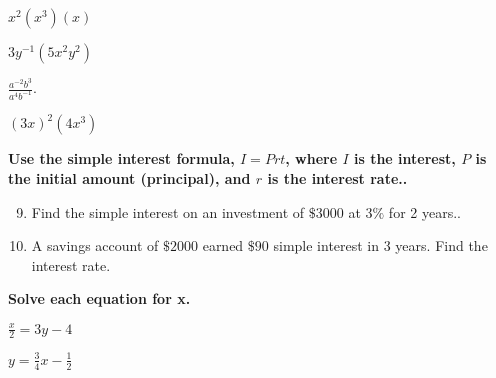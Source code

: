 \documentclass{report}
\theoremstyle{definition}
\begin{document}
\begin{enumerate}
\setcounter{enumi}{4}
	\begin{minipage}[t]{0.225\linewidth}
	\item $x^2(x^3)(x)$
	\end{minipage}
	\begin{minipage}[t]{0.225\linewidth}
	\item $3y^{-1}(5x^2y^2)$
	\end{minipage}
	\begin{minipage}[t]{0.225\linewidth}
	\item $\displaystyle \frac{a^{-2}b^3}{a^4b^{-1}}$.
	\end{minipage}
	\begin{minipage}[t]{0.225\linewidth}
	\item $(3x)^2(4x^3)$
	\end{minipage}
\end{enumerate}

\vspace{2cm}

\noindent \textbf{Use the simple interest formula, $I=Prt$, where $I$ is the interest, $P$ is the initial amount (principal), and $r$ is the interest rate..}\\

\begin{enumerate}
\setcounter{enumi}{8}
		\item Find the simple interest on an investment of $\$3000$ at $3\%$ for 2 years..
			\vfill
		\item A savings account of $\$2000$ earned $\$90$ simple interest in 3 years. Find the interest rate.
			\vfill
\end{enumerate}

\noindent \textbf{Solve each equation for x.}\\

\begin{enumerate}
\setcounter{enumi}{10}
	\begin{minipage}[t]{0.45\linewidth}
	\item $\displaystyle \frac{x}{2}=3y-4$
	\end{minipage}
	\begin{minipage}[t]{0.45\linewidth}
	\item $\displaystyle  y=\frac{3}{4}x-\frac{1}{2}$
	\end{minipage}
\end{enumerate}
\vfill
\begin{flushright}
\\
\vspace{0.5cm}
\end{flushright}
	
\end{document}
